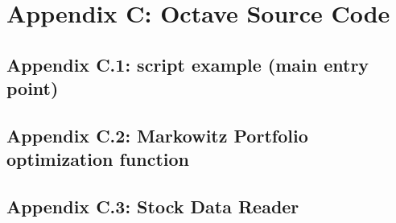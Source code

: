 %

\section{Appendix C: Octave Source Code}
\label{sec:appendix_c}

\subsection{Appendix C.1: script example (main entry point)}
\label{sec:markowitzDemo_m}


\subsection{Appendix C.2: Markowitz Portfolio optimization function}
\label{sec:markowitzPortfolio_m}


\subsection{Appendix C.3: Stock Data Reader}
\label{sec:getStockData_m}


